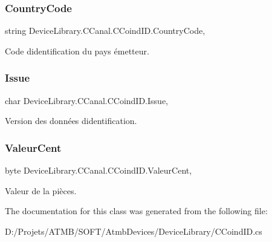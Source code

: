 \subsubsection{\texorpdfstring{Country\+Code}{CountryCode}}
{\footnotesize\ttfamily string Device\+Library.\+C\+Canal.\+C\+Coind\+I\+D.\+Country\+Code\hspace{0.3cm}{\ttfamily [get]}, {\ttfamily [set]}}



Code d\textquotesingle{}identification du pays émetteur. 

\mbox{\label{class_device_library_1_1_c_canal_1_1_c_coind_i_d_aaa7709d1d94fb5d841ca1b3ef0bb47e3}} 
\subsubsection{\texorpdfstring{Issue}{Issue}}
{\footnotesize\ttfamily char Device\+Library.\+C\+Canal.\+C\+Coind\+I\+D.\+Issue\hspace{0.3cm}{\ttfamily [get]}, {\ttfamily [set]}}



Version des données d\textquotesingle{}identification. 

\mbox{\label{class_device_library_1_1_c_canal_1_1_c_coind_i_d_a0fdc934186beed598fe42ad82a75a3fa}} 
\subsubsection{\texorpdfstring{Valeur\+Cent}{ValeurCent}}
{\footnotesize\ttfamily byte Device\+Library.\+C\+Canal.\+C\+Coind\+I\+D.\+Valeur\+Cent\hspace{0.3cm}{\ttfamily [get]}, {\ttfamily [set]}}



Valeur de la pièces. 



The documentation for this class was generated from the following file\+:\begin{DoxyCompactItemize}
\item 
D\+:/\+Projets/\+A\+T\+M\+B/\+S\+O\+F\+T/\+Atmb\+Devices/\+Device\+Library/C\+Coind\+I\+D.\+cs\end{DoxyCompactItemize}
